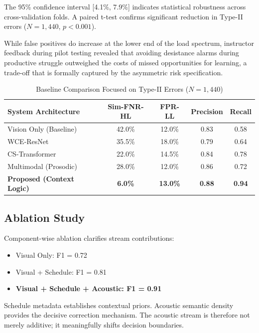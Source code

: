 \documentclass[conference]{IEEEtran}
\begin{document}
The 95\% confidence interval [4.1\%, 7.9\%] indicates statistical robustness across cross-validation folds. A paired t-test confirms significant reduction in Type-II errors ($N = 1,440$, $p < 0.001$).

While false positives do increase at the lower end of the load spectrum, instructor feedback during pilot testing revealed that avoiding desistance alarms during productive struggle outweighed the costs of missed opportunities for learning, a trade-off that is formally captured by the asymmetric risk specification.

\begin{table}[htbp]
\caption{Baseline Comparison Focused on Type-II Errors ($N=1,440$)}
\begin{center}
\begin{tabular}{lcccc}
\toprule
\textbf{System Architecture} & \textbf{Sim-FNR-HL} & \textbf{FPR-LL} & \textbf{Precision} & \textbf{Recall} \\
\midrule
Vision Only (Baseline) & 42.0\% & 12.0\% & 0.83 & 0.58 \\
WCE-ResNet & 35.5\% & 18.0\% & 0.79 & 0.64 \\
CS-Transformer & 22.0\% & 14.5\% & 0.84 & 0.78 \\
Multimodal (Prosodic) & 28.0\% & 12.0\% & 0.86 & 0.72 \\
\textbf{Proposed (Context Logic)} & \textbf{6.0\%} & \textbf{13.0\%} & \textbf{0.88} & \textbf{0.94} \\
\bottomrule
\end{tabular}
\end{center}
\end{table}

\subsection{Ablation Study}
Component-wise ablation clarifies stream contributions:
\begin{itemize}
    \item Visual Only: F1 = 0.72
    \item Visual + Schedule: F1 = 0.81
    \item \textbf{Visual + Schedule + Acoustic: F1 = 0.91}
\end{itemize}

Schedule metadata establishes contextual priors. Acoustic semantic density provides the decisive correction mechanism. The acoustic stream is therefore not merely additive; it meaningfully shifts decision boundaries.
\end{document}
